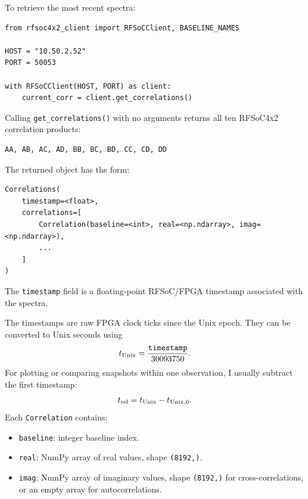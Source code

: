 \documentclass[12pt]{extarticle}
\begin{document}
To retrieve the most recent spectra:
\begin{lstlisting}
from rfsoc4x2_client import RFSoCClient, BASELINE_NAMES

HOST = "10.50.2.52"
PORT = 50053

with RFSoCClient(HOST, PORT) as client:
    current_corr = client.get_correlations()
\end{lstlisting}

Calling \texttt{get\_correlations()} with no arguments returns all ten RFSoC4x2 correlation products:
\begin{lstlisting}
AA, AB, AC, AD, BB, BC, BD, CC, CD, DD
\end{lstlisting}

The returned object has the form:
\begin{lstlisting}
Correlations(
    timestamp=<float>,
    correlations=[
        Correlation(baseline=<int>, real=<np.ndarray>, imag=<np.ndarray>),
        ...
    ]
)
\end{lstlisting}

The \texttt{timestamp} field is a floating-point RFSoC/FPGA timestamp associated with the spectra.

The timestamps are raw FPGA clock ticks since the Unix epoch. They can be converted to Unix seconds using
\begin{equation}
t_{\rm Unix} = \frac{\texttt{timestamp}}{30093750}.
\end{equation}
For plotting or comparing snapshots within one observation, I usually subtract the first timestamp:
\begin{equation}
t_{\rm rel} = t_{\rm Unix} - t_{\rm Unix,0}.
\end{equation}
Each \texttt{Correlation} contains:
\begin{itemize}
    \item \texttt{baseline}: integer baseline index.
    \item \texttt{real}: NumPy array of real values, shape \texttt{(8192,)}.
    \item \texttt{imag}: NumPy array of imaginary values, shape \texttt{(8192,)} for cross-correlations, or an empty array for autocorrelations.
\end{itemize}
\end{document}
